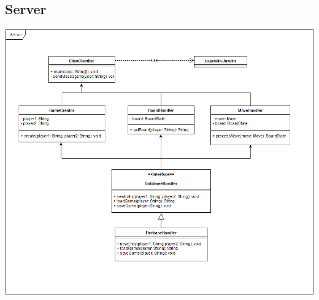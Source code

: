 \documentclass[parskip=full]{scrartcl}
\begin{document}
		\subsection{Server}
		\begin{minipage}{\linewidth}
			\centering
			\includegraphics[width=1\linewidth]{Diagramme/Server}
			\label{fig:server}
		\end{minipage}
\end{document}
